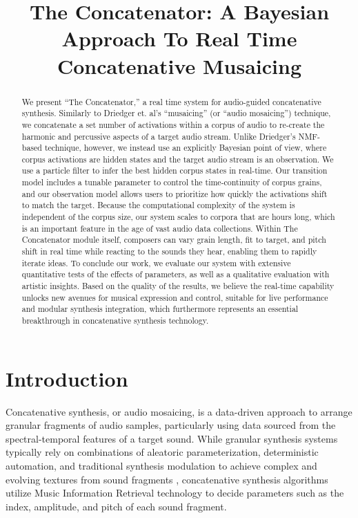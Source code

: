 \documentclass{article}
\title{The Concatenator: A Bayesian Approach To Real Time Concatenative Musaicing}
\begin{document}
%
\maketitle
%

\begin{abstract}
    We present ``The Concatenator,'' a real time system for audio-guided concatenative synthesis. Similarly to Driedger et. al's ``musaicing'' (or ``audio mosaicing'') technique, we concatenate a set number of activations within a corpus of audio to re-create the harmonic and percussive aspects of a target audio stream. Unlike Driedger's NMF-based technique, however, we instead use an explicitly Bayesian point of view, where corpus activations are hidden states and the target audio stream is an observation. We use a particle filter to infer the best hidden corpus states in real-time. Our transition model includes a tunable parameter to control the time-continuity of corpus grains, and our observation model allows users to prioritize how quickly the activations shift to match the target. Because the computational complexity of the system is independent of the corpus size, our system scales to corpora that are hours long, which is an important feature in the age of vast audio data collections. Within The Concatenator module itself, composers can vary grain length, fit to target, and pitch shift in real time while reacting to the sounds they hear, enabling them to rapidly iterate ideas. To conclude our work, we evaluate our system with extensive quantitative tests of the effects of parameters, as well as a qualitative evaluation with artistic insights. Based on the quality of the results, we believe the real-time capability unlocks new avenues for musical expression and control, suitable for live performance and modular synthesis integration, which furthermore represents an essential breakthrough in concatenative synthesis technology.
    
\end{abstract}

\section{Introduction}

Concatenative synthesis, or audio mosaicing, is a data-driven approach to arrange granular fragments of audio samples, particularly using data sourced from the spectral-temporal features of a target sound. While granular synthesis systems typically rely on combinations of aleatoric parameterization, deterministic automation, and traditional synthesis modulation to achieve complex and evolving textures from sound fragments \cite{roads1978granular}, concatenative synthesis algorithms utilize Music Information Retrieval technology to decide parameters such as the index, amplitude, and pitch of each sound fragment. 
\end{document}
